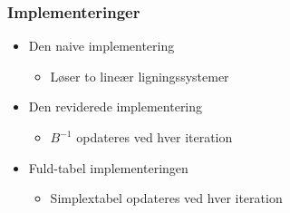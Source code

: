 %
%
%
\begin{frame}
\frametitle{Implementeringer}
\begin{itemize}
\item Den naive implementering 
	\begin{itemize}
	\item Løser to lineær ligningssystemer
	\end{itemize}
\item Den reviderede implementering 
	\begin{itemize}
	\item $B^{-1}$ opdateres ved hver iteration
	\end{itemize}
\item Fuld-tabel implementeringen
	\begin{itemize}
	\item Simplextabel opdateres ved hver iteration
	\end{itemize} 
\end{itemize}
\end{frame}

